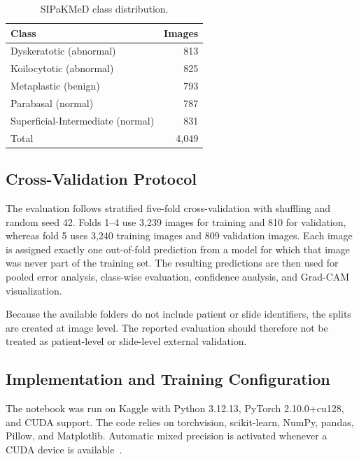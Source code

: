 \documentclass[10pt,conference]{IEEEtran}
\begin{document}
\begin{table}[!t]
\caption{SIPaKMeD class distribution.}
\label{tab:dataset}
\centering
\footnotesize
\begin{tabular}{lr}
\toprule
Class & Images\\
\midrule
Dyskeratotic (abnormal) & 813\\
Koilocytotic (abnormal) & 825\\
Metaplastic (benign) & 793\\
Parabasal (normal) & 787\\
Superficial-Intermediate (normal) & 831\\
\midrule
Total & 4,049\\
\bottomrule
\end{tabular}
\end{table}

\subsection{Cross-Validation Protocol}

The evaluation follows stratified five-fold cross-validation with shuffling and random seed 42. Folds 1--4 use 3,239 images for training and 810 for validation, whereas fold 5 uses 3,240 training images and 809 validation images. Each image is assigned exactly one out-of-fold prediction from a model for which that image was never part of the training set. The resulting predictions are then used for pooled error analysis, class-wise evaluation, confidence analysis, and Grad-CAM visualization.

Because the available folders do not include patient or slide identifiers, the splits are created at image level. The reported evaluation should therefore not be treated as patient-level or slide-level external validation.

\subsection{Implementation and Training Configuration}

The notebook was run on Kaggle with Python 3.12.13, PyTorch 2.10.0+cu128, and CUDA support. The code relies on torchvision, scikit-learn, NumPy, pandas, Pillow, and Matplotlib. Automatic mixed precision is activated whenever a CUDA device is available~\cite{paszke2019pytorch}.
\end{document}
